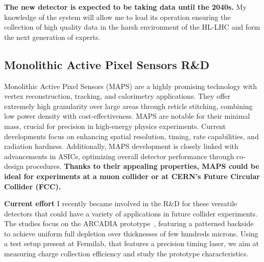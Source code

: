 {\begin{flushleft}
{\bf The new detector is expected to be taking data until the 2040s.} My knowledge of the system will allow me to lead its operation ensuring the collection of high quality data in the harsh environment of the HL-LHC and form the next generation of experts.

\vskip 5pt 
\subsection{Monolithic Active Pixel Sensors R\&D}
\vskip 4pt
Monolithic Active Pixel Sensors (MAPS) are a highly promising technology with vertex reconstruction, tracking, and calorimetry applications. They offer extremely high granularity over large areas through reticle stitching, combining low power density with cost-effectiveness. MAPS are notable for their minimal mass, crucial for precision in high-energy physics experiments.
Current developments focus on enhancing spatial resolution, timing, rate capabilities, and radiation hardness. Additionally, MAPS development is closely linked with advancements in ASICs, optimizing overall detector performance through co-design procedures. {\bf Thanks to their appealing properties, MAPS could be ideal for experiments at a muon collider or at CERN's Future Circular Collider (FCC).}

\textbf{Current effort}
I recently became involved in the R\&D for these versatile detectors that could have a variety of applications in future collider experiments. The studies focus on the ARCADIA prototype~\cite{[8]}, featuring a patterned backside to achieve uniform full depletion over thicknesses of few hundreds microns. Using a test setup present at Fermilab, that features a precision timing laser, we aim at measuring charge collection efficiency and study the prototype characteristics.


\end{flushleft}}
